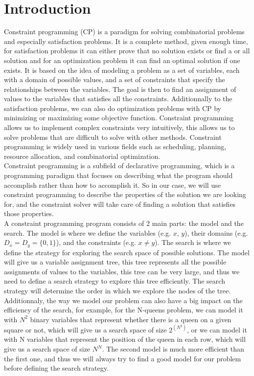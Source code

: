 \documentclass[12pt, openany]{report}
\theoremstyle{definition}
\begin{document}
\chapter{Introduction}
Constraint programming (CP) is a paradigm for solving combinatorial problems and especially satisfaction problems. It is a complete method, given enough time, for satisfaction problems it can either prove that no solution exists or find a or all solution and for an optimization problem it can find an optimal solution if one exists. It is based on the idea of modeling a problem as a set of variables, each with a domain of possible values, and a set of constraints that specify the relationships between the variables. The goal is then to find an assignment of values to the variables that satisfies all the constraints. Additionnally to the satisfaction problems, we can also do optimization problems with CP by minimizing or maximizing some objective function. Constraint programming allows us to implement complex constraints very intuitively, this allows us to solve problems that are difficult to solve with other methods. Constraint programming is widely used in various fields such as scheduling, planning, resource allocation, and combinatorial optimization.\\
Constraint programming is a subfield of declarative programming, which is a programming paradigm that focuses on describing what the program should accomplish rather than how to accomplish it. So in our case, we will use constraint programming to describe the properties of the solution we are looking for, and the constraint solver will take care of finding a solution that satisfies those properties.\\
A constraint programming program consists of 2 main parts: the model and the search. The model is where we define the variables (e.g. $x$, $y$), their domains (e.g. $D_x = D_y = \{0,1\}$), and the constraints (e.g. $x \neq y$). The search is where we define the strategy for exploring the search space of possible solutions. The model will give us a variable assignment tree, this tree represents all the possible assignments of values to the variables, this tree can be very large, and thus we need to define a search strategy to explore this tree efficiently. The search strategy will determine the order in which we explore the nodes of the tree. Additionnaly, the way we model our problem can also have a big impact on the efficiency of the search, for example, for the N-queens problem, we can model it with $N^2$ binary variables that represent whether there is a queen on a given square or not, which will give us a search space of size $2^{(N^2)}$, or we can model it with N variables that represent the position of the queen in each row, which will give us a search space of size $N^N$. The second model is much more efficient than the first one, and thus we will always try to find a good model for our problem before defining the search strategy.
\end{document}
